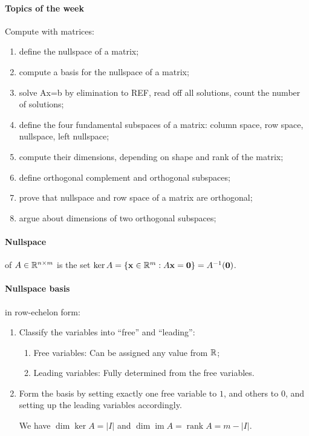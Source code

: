 \documentclass{article}
\begin{document}
\paragraph{Topics of the week} Compute with matrices:  

\begin{enumerate}
    \item define the nullspace of a matrix;
    \item compute a basis for the nullspace of a matrix; 
    \item solve Ax=b by elimination to REF, read off all solutions, count the number of solutions;
    \item define the four fundamental subspaces of a matrix: column space, row space, nullspace, left nullspace; 
    \item compute their dimensions, depending on shape and rank of the matrix;
    \item define orthogonal complement and orthogonal subspaces;
    \item prove that nullspace and row space of a matrix are orthogonal;
    \item argue about dimensions of two orthogonal subspaces;
\end{enumerate}

\paragraph{Nullspace} of $A \in \mathbb{R}^{n \times m}$ is the set $\ker A = \{\mathbf x \in \mathbb{R}^m : A \mathbf x = \mathbf 0\} = A^{-1}(\mathbf 0)$.

\paragraph{Nullspace basis} in row-echelon form:

\begin{enumerate}
    \item Classify the variables into ``free'' and ``leading'':
    \begin{enumerate}
        \item Free variables: Can be assigned any value from $\mathbb{R}$;
        \item Leading variables: Fully determined from the free variables.
    \end{enumerate}
    \item Form the basis by setting exactly one free variable to $1$, and others to $0$, and setting up the leading variables accordingly.
    
    We have $\dim \ker A = |I|$ and $\dim \operatorname{im} A = \operatorname{rank} A = m - |I|$.
\end{enumerate}
\end{document}
